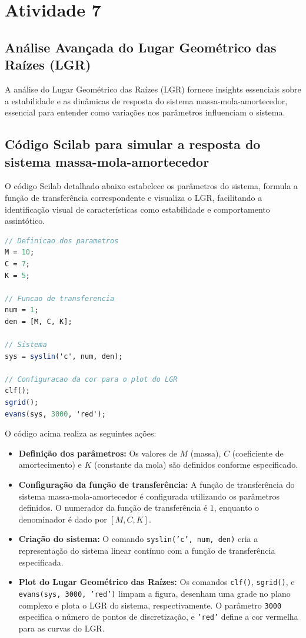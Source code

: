 \section{Atividade 7}

\subsection{Análise Avançada do Lugar Geométrico das Raízes (LGR)}

A análise do Lugar Geométrico das Raízes (LGR) fornece insights essenciais sobre a estabilidade e as dinâmicas de resposta do sistema massa-mola-amortecedor, essencial para entender como variações nos parâmetros influenciam o sistema.
\subsection{Código Scilab para simular a resposta do sistema massa-mola-amortecedor}

O código Scilab detalhado abaixo estabelece os parâmetros do sistema, formula a função de transferência correspondente e visualiza o LGR, facilitando a identificação visual de características como estabilidade e comportamento assintótico.

\begin{lstlisting}[language=Scilab, caption=Código Scilab para simular o Lugar geométrico das raízes]
// Definicao dos parametros
M = 10;
C = 7;
K = 5;

// Funcao de transferencia
num = 1;
den = [M, C, K];

// Sistema
sys = syslin('c', num, den);

// Configuracao da cor para o plot do LGR
clf();
sgrid();
evans(sys, 3000, 'red');
\end{lstlisting}

O código acima realiza as seguintes ações:
\begin{itemize}
    \item \textbf{Definição dos parâmetros:} Os valores de \( M \) (massa), \( C \) (coeficiente de amortecimento) e \( K \) (constante da mola) são definidos conforme especificado.
    \item \textbf{Configuração da função de transferência:} A função de transferência do sistema massa-mola-amortecedor é configurada utilizando os parâmetros definidos. O numerador da função de transferência é \(1\), enquanto o denominador é dado por \( [M, C, K] \).
    \item \textbf{Criação do sistema:} O comando \texttt{syslin('c', num, den)} cria a representação do sistema linear contínuo com a função de transferência especificada.
    \item \textbf{Plot do Lugar Geométrico das Raízes:} Os comandos \texttt{clf()}, \texttt{sgrid()}, e \texttt{evans(sys, 3000, 'red')} limpam a figura, desenham uma grade no plano complexo e plota o LGR do sistema, respectivamente. O parâmetro \texttt{3000} especifica o número de pontos de discretização, e \texttt{'red'} define a cor vermelha para as curvas do LGR.
\end{itemize}

